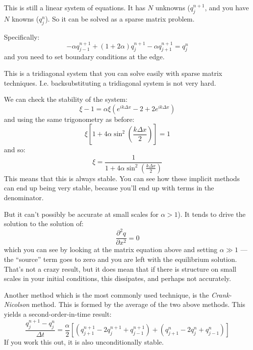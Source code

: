 
\begin{answer}
This is still a linear system of equations. It has $N$ unknowns
($q_j^{n+1}$, and you have $N$ knowns ($q_j^{n}$). So it can be solved
as a sparse matrix problem. 

Specifically:
\begin{equation}
-\alpha q_{j-1}^{n+1} + (1 + 2\alpha) q_j^{n+1} - \alpha q_{j+1}^{n+1}
 = q_j^n
\end{equation}
and you need to set boundary conditions at the edge.

This is a tridiagonal system that you can solve easily with sparse
matrix techniques. I.e. backsubstituting a tridiagonal system is not
very hard.
\end{answer}

We can check the stability of the system:
\begin{equation}
\xi - 1 = \alpha \xi \left(e^{ik\Delta x} - 2 + 2 e^{ik\Delta x}\right)
\end{equation}
and using the same trigonometry as before:
\begin{equation}
\xi \left[ 1+ 4 \alpha \sin^2\left(\frac{k\Delta x}{2}\right)\right] =
1
\end{equation}
and so:
\begin{equation}
\xi = \frac{1}{ 1+ 4 \alpha \sin^2\left(\frac{k\Delta x}{2}\right)}
\end{equation}
This means that this is always stable. You can see how these implicit
methods can end up being very stable, because you'll end up with terms
in the denominator.

But it can't possibly be accurate at small scales for $\alpha>1$). It
tends to drive the solution to the solution of:
\begin{equation}
\frac{\partial^2 q}{\partial x^2} = 0
\end{equation}
which you can see by looking at the matrix equation above and setting
$\alpha\gg 1$ --- the ``source'' term goes to zero and you are left
with the equilibrium solution.  That's not a crazy result, but it does
mean that if there is structure on small scales in your initial
conditions, this dissipates, and perhaps not accurately. 

Another method which is the most commonly used technique, is the {\it
Crank-Nicolson} method. This is formed by the average of the two above
methods. This yields a second-order-in-time result:
\begin{equation}
\frac{q_j^{n+1} - q_j^n}{\Delta t}
= \frac{\alpha}{2}
\left[
  \left(q_{j+1}^{n+1} - 2 q_j^{n+1} + q_{j-1}^{n+1}\right) + 
  \left(q_{j+1}^{n} - 2 q_j^{n} + q_{j-1}^{n}\right)
\right]
\end{equation}
If you work this out, it is also unconditionally stable. 

